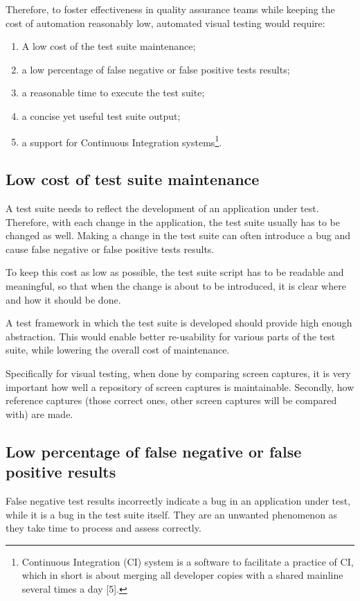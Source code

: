 \documentclass[11pt,oneside,final]{fithesis2}
\begin{document}
  Therefore, to foster effectiveness in quality assurance teams while keeping the cost of automation reasonably low, automated visual testing would require:
  \begin{enumerate}
   \item A low cost of the test suite maintenance;
   \item a low percentage of false negative or false positive tests results;
   \item a reasonable time to execute the test suite;
   \item a concise yet useful test suite output;
   \item a support for Continuous Integration systems\footnote{Continuous Integration (CI) system is a software to facilitate a practice of CI, which in short is about merging 
	  all developer copies with a shared mainline several times a day [5].}.
  \end{enumerate}
  
    \subsection{Low cost of test suite maintenance}
    A test suite needs to reflect the development of an application under test. Therefore, with each change in the application, the test suite usually has to be changed as well.
    Making a change in the test suite can often introduce a bug and cause false negative or false positive tests results.
    
    To keep this cost as low as possible, the test suite script has to be readable and meaningful, so that when the change is about to be introduced, it is clear where and how it should be done.
    
    A test framework in which the test suite is developed should provide high enough abstraction. This would enable better re-usability for various parts of the test suite, 
    while lowering the overall cost of maintenance.
    
    Specifically for visual testing, when done by comparing screen captures, it is very important how well a repository of screen captures is maintainable. Secondly, 
    how reference captures (those correct ones, other screen captures will be compared with) are made.
    
    \subsection{Low percentage of false negative or false positive results}
    False negative test results incorrectly indicate a bug in an application under test, while it is a bug in the test suite itself. They are an unwanted phenomenon as they take time to process
    and assess correctly.
    
\end{document}
